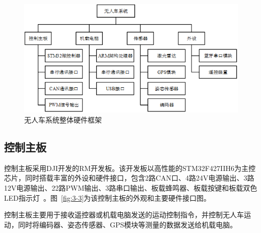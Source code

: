\clearpage 
\begin{figure}[htb]
	\centering
	\includegraphics[width=\linewidth]{figures/3-2.png}
	\caption{无人车系统整体硬件框架}
	\label{fig:3-2}
\end{figure}

\subsection{控制主板}
控制主板采用DJI开发的RM开发板。该开发板以高性能的STM32F427IIH6为主控芯片，同时搭载丰富的外设和硬件接口，包含2路CAN口、4路24V电源输出、3路12V电源输出、22路PWM输出、3路串口输出、板载蜂鸣器、板载按键和板载双色LED指示灯~。图~\ref{fig:3-3}为该控制主板的外观和主要硬件接口图。

控制主板主要用于接收遥控器或机载电脑发送的运动控制指令，并控制无人车运动，同时将编码器、姿态传感器、GPS模块等测量的数据发送给机载电脑。


